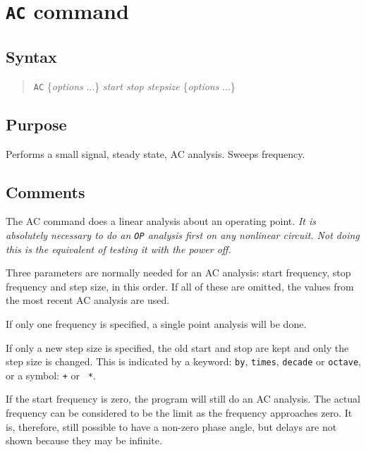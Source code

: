 \section{{\tt AC} command}
\subsection{Syntax}
\begin{verse}
{\tt AC} \{{\it options} ...\} {\it start stop stepsize} \{{\it options} ...\}
\end{verse}
\subsection{Purpose}

Performs a small signal, steady state, AC analysis.  Sweeps frequency.
\subsection{Comments}

The AC command does a linear analysis about an operating point.  {\em It is absolutely
necessary to do an {\tt OP} analysis first on any nonlinear circuit.  Not
doing this is the equivalent of testing it with the power off.}

Three parameters are normally needed for an AC analysis: start frequency,
stop frequency and step size, in this order.  If all of these are omitted,
the values from the most recent AC analysis are used.

If only one frequency is specified, a single point analysis will be done.

If only a new step size is specified, the old start and stop are kept and
only the step size is changed.  This is indicated by a keyword: {\tt by},
{\tt times}, {\tt decade} or {\tt octave}, or a symbol: {\tt +} or {\tt
*}.

If the start frequency is zero, the program will still do an AC analysis.
The actual frequency can be considered to be the limit as the frequency
approaches zero.  It is, therefore, still possible to have a non-zero
phase angle, but delays are not shown because they may be infinite.

